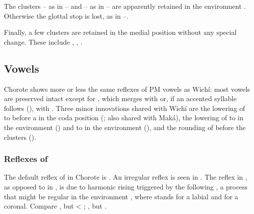 \begin{exe}
    \ex \kingvulture
    \ex \anteater
    \ex \likelove
\end{exe}

The clusters  – as in  – and  – as in  – are apparently retained in the environment . Otherwise the glottal stop is lost, as in –.

\begin{exe}
    \ex \rat \label{ch-m-rat}
    \ex \doveula \label{ch-l-doveula}
    \ex \soninlaw \label{ch-l-soninlaw}
    \ex \daylhuma \label{ch-m-daylhuma}
\end{exe}

Finally, a few clusters are retained in the medial position without any special change. These include , , .

\begin{exe}
    \ex \spouse
    \ex \majan
    \ex \widower
\end{exe}

\subsection{Vowels}\label{ch-vow}

Chorote shows more or less the same reflexes of PM vowels as Wichí: most vowels are preserved intact except for , which merges with  or, if an accented syllable follows (), with . Three minor innovations shared with Wichí are the lowering of  to  before a  in the coda position (; also shared with Maká), the lowering of  to  in the environment  () and to  in the environment  (), and the rounding of  before the clusters  ().

\subsubsection{Reflexes of } \label{pm-ch-ae}
The default reflex of  in Chorote is . An irregular reflex is seen in . The reflex  in , as opposed to  in , is due to harmonic rising triggered by the following , a process that might be regular in the environment \mbox{}, where  stands for a labial and  for a coronal. Compare , but  < ; , but .

